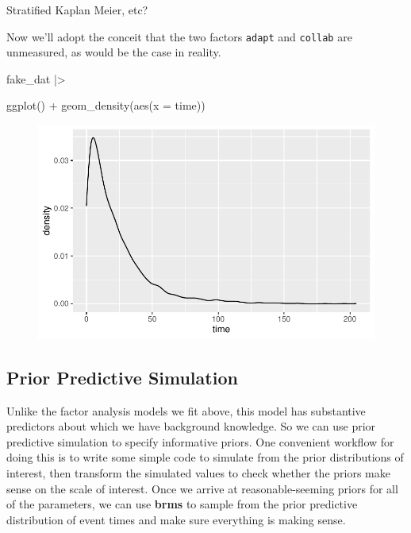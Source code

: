 \documentclass[
  letterpaper,
  DIV=11,
  numbers=noendperiod]{scrreprt}
\newenvironment{Shaded}{\begin{snugshade}}{\end{snugshade}}
\newcommand{\AttributeTok}[1]{\textcolor[rgb]{0.40,0.45,0.13}{#1}}
\newcommand{\FunctionTok}[1]{\textcolor[rgb]{0.28,0.35,0.67}{#1}}
\newcommand{\NormalTok}[1]{\textcolor[rgb]{0.00,0.23,0.31}{#1}}
\newcommand{\SpecialCharTok}[1]{\textcolor[rgb]{0.37,0.37,0.37}{#1}}
\begin{document}
Stratified Kaplan Meier, etc?

Now we'll adopt the conceit that the two factors \texttt{adapt} and
\texttt{collab} are unmeasured, as would be the case in reality.

\begin{Shaded}
\begin{Highlighting}[]
\NormalTok{fake\_dat }\SpecialCharTok{|\textgreater{}}

    \FunctionTok{ggplot}\NormalTok{() }\SpecialCharTok{+} 
    \FunctionTok{geom\_density}\NormalTok{(}\FunctionTok{aes}\NormalTok{(}\AttributeTok{x =}\NormalTok{ time))}
\end{Highlighting}
\end{Shaded}

\begin{figure}[H]

{\centering \includegraphics{./bayesian-cfa_files/figure-pdf/unnamed-chunk-23-1.pdf}

}

\end{figure}

\hypertarget{prior-predictive-simulation}{%
\subsection*{Prior Predictive
Simulation}\label{prior-predictive-simulation}}

Unlike the factor analysis models we fit above, this model has
substantive predictors about which we have background knowledge. So we
can use prior predictive simulation to specify informative priors. One
convenient workflow for doing this is to write some simple code to
simulate from the prior distributions of interest, then transform the
simulated values to check whether the priors make sense on the scale of
interest. Once we arrive at reasonable-seeming priors for all of the
parameters, we can use \textbf{brms} to sample from the prior predictive
distribution of event times and make sure everything is making sense.
\end{document}
